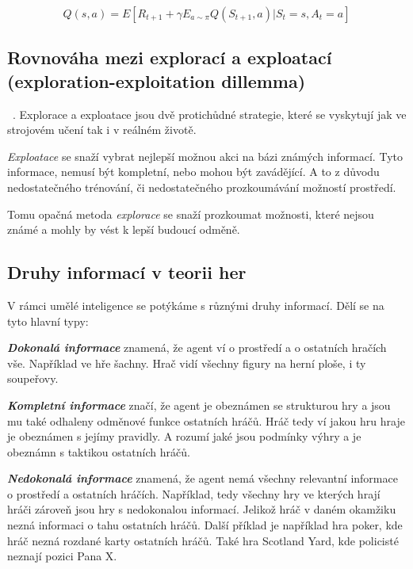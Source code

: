 \begin{equation}
  Q(s, a) = E[R_{t+1} + \gamma E_{a\sim\pi}Q(S_{t+1}, a) | S_t = s, A_t = a]\label{eq:bellman2}
\end{equation}

\subsection{Rovnováha mezi explorací a exploatací (exploration-exploitation dillemma)}
\label{subsec:exploration-exploitation-dillemma}~\cite[Kompromis mezi potřebou získávat nové znalosti a potřebou použít již nabyté znalosti k vylepšení výkonnosti je jedním z nejzákladnějších kompromisů v přírodě]{Exploitation_Exploration}.
Explorace a exploatace jsou dvě protichůdné strategie, které se vyskytují jak ve strojovém učení tak i v reálném životě.

\emph{Exploatace} se snaží vybrat nejlepší možnou akci na bázi známých informací.
Tyto informace, nemusí být kompletní, nebo mohou být zavádějící.
A to z důvodu nedostatečného trénování, či nedostatečného prozkoumávání možností prostředí.

Tomu opačná metoda \emph{explorace} se snaží prozkoumat možnosti, které nejsou známé a mohly by vést k lepší budoucí odměně.

\subsection{Druhy informací v teorii her}\label{subsec:druhy-informaci-v-teorii-her}
V rámci umělé inteligence se potýkáme s různými druhy informací.
Dělí se na tyto hlavní typy:

\textbf{\emph{Dokonalá informace}} znamená, že agent ví o prostředí a o ostatních hračích vše.
Například ve hře šachny.
Hrač vidí všechny figury na herní ploše, i ty soupeřovy.

\textbf{\emph{Kompletní informace}} značí, že agent je obeznámen se strukturou hry a jsou mu také odhaleny odměnové funkce ostatních hráčů.
Hráč tedy ví jakou hru hraje je obeznámen s jejímy pravidly.
A rozumí jaké jsou podmínky výhry a je obeznámn s taktikou ostatních hráčů.

\textbf{\emph{Nedokonalá informace}} znamená, že agent nemá všechny relevantní informace o prostředí a ostatních hráčích.
Například, tedy všechny hry ve kterých hrají hráči zároveň jsou hry s nedokonalou informací.
Jelikož hráč v daném okamžiku nezná informaci o tahu ostatních hráčů.
Další příklad je například hra poker, kde hráč nezná rozdané karty ostatních hráčů.
Také hra Scotland Yard, kde policisté neznají pozici Pana X\@.

